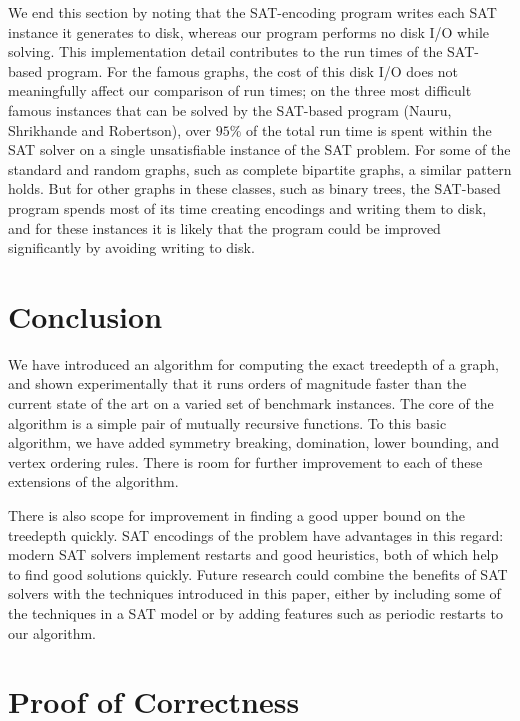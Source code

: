 {    We end this section by noting that the SAT-encoding program writes each SAT
    instance it generates to disk, whereas our program performs no disk I/O while
    solving.  This implementation detail contributes to the run times of the
    SAT-based program.  For the famous graphs, the cost of this disk I/O
    does not meaningfully affect our comparison of run times; on
    the three most difficult famous instances that can be solved by the SAT-based
    program (Nauru, Shrikhande and Robertson), over $95\%$ of the total run time is
    spent within the SAT solver on a single unsatisfiable instance of the SAT
    problem.  For some of the standard and random graphs, such as complete
    bipartite graphs, a similar pattern holds.  But for other graphs in these
    classes, such as binary trees, the SAT-based program spends most of its time
    creating encodings and writing them to disk, and for these instances it
    is likely that the program could be improved significantly by
    avoiding writing to disk.

    \section{Conclusion} \label{sec:conclusion}

    We have introduced an algorithm for computing the exact treedepth of a graph, and shown
    experimentally that it runs orders of magnitude faster than the current state of the art
    on a varied set of benchmark instances.  The core of the algorithm is a
    simple pair of mutually recursive functions.
    To this basic algorithm, we have added symmetry breaking, domination,
    lower bounding, and vertex ordering rules.  There is room for further
    improvement to each of these extensions of the algorithm.

    There is also scope for improvement in finding a good upper bound on the treedepth
    quickly.
    SAT encodings of the problem have advantages in this regard:
    modern SAT solvers implement restarts and good heuristics, both of which help to find
    good solutions quickly.  Future research could combine the benefits of SAT solvers with
    the techniques introduced in this paper, either by including some of the techniques
    in a SAT model or by adding features such as periodic restarts to our algorithm.

    \appendix
    \section{Proof of Correctness} \label{appendix:proof}

}
